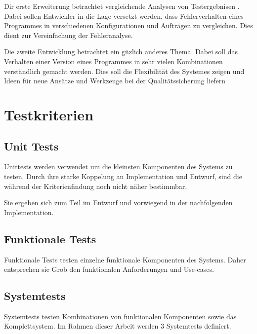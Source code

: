 Dir erste Erweiterung betrachtet vergleichende Analysen von Testergebnisen .
Dabei sollen Entwickler in die Lage versetzt werden,
dass Fehlerverhalten eines Programmes in verschiedenen Konfigurationen und Auftr\"agen zu vergleichen.
Dies dient zur Vereinfachung der Fehleranalyse.

Die zweite Entwicklung betrachtet ein g\"nzlich anderes Thema.
Dabei soll das Verhalten einer Version eines Programmes
in sehr vielen Kombinationen verst\"andlich gemacht werden.
Dies soll die Flexibilit\"at des Systemes zeigen und
Ideen f\"ur neue Ans\"atze und Werkzeuge bei der Qualit\"atssicherung liefern





\section{Testkriterien}
\subsection{Unit Tests}

Unittests werden verwendet um die kleinsten Komponenten des Systems zu testen.
Durch ihre starke Koppelung an Implementation und Entwurf,
sind die w\"ahrend der Kriterienfindung noch nicht n\"aher bestimmbar.

Sie ergeben sich zum Teil im Entwurf und vorwiegend in
der nachfolgenden Implementation.

\subsection{Funktionale Tests}

Funktionale Tests testen einzelne funktionale Komponenten des Systems.
Daher entsprechen sie Grob den funktionalen Anforderungen und Use-cases.

\subsection{Systemtests}

Systemtests testen Kombinationen von funktionalen Komponenten sowie das Komplettsystem.
Im Rahmen dieser Arbeit werden 3 Systemtests definiert.



